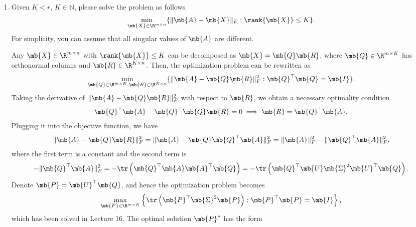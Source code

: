 \begin{exercise}
\begin{enumerate}
        \item
            Given $K<r$, $K\in \mathbb{N}$, please solve the problem as follows
            \begin{align*}
                \min_{\mb{X}\in\R^{m\times n}}\{\|\mb{A}-\mb{X}\|_F:\rank{\mb{X}}\leq K\}.
            \end{align*}
            For simplicity, you can assume that all singular values of $\mb{A}$ are different.

            \begin{solution}
                Any $\mb{X} \in \R^{m\times n}$ with $\rank{\mb{X}}\leq K$ can be decomposed as $\mb{X}=\mb{Q}\mb{R}$, where $\mb{Q}\in\R^{m\times K}$ has orthonormal columns and $\mb{R}\in\R^{K\times n}$. Then, the optimization problem can be rewritten as
                \begin{align*}
                    \min_{\mb{Q}\in\R^{m\times K},\mb{R}\in\R^{K\times n}}\{\|\mb{A}-\mb{Q}\mb{R}\|^2_F:\mb{Q}^\top\mb{Q}=\mb{I}\}.
                \end{align*}
                Taking the derivative of $\|\mb{A}-\mb{Q}\mb{R}\|^2_F$ with respect to $\mb{R}$, we obtain a necessary optimality condition
                \begin{align*}
                    \mb{Q}^\top\mb{A} - \mb{Q}^\top\mb{Q}\mb{R} = 0 \implies \mb{R} = \mb{Q}^\top\mb{A}.
                \end{align*}
                Plugging it into the objective function, we have
                \begin{align*}
                    \|\mb{A}-\mb{Q}\mb{R}\|^2_F = \|\mb{A}-\mb{Q}\mb{Q}^\top\mb{A}\|^2_F = \|\mb{A}\|^2_F - \|\mb{Q}^\top\mb{A}\|^2_F,
                \end{align*}
                where the first term is a constant and the second term is
                \begin{align*}
                    - \|\mb{Q}^\top\mb{A}\|^2_F = - \tr \left(\mb{Q}^\top\mb{A}\mb{A}^\top\mb{Q}\right) = - \tr \left(\mb{Q}^\top \mb{U} \mb{\Sigma}^2 \mb{U}^\top \mb{Q}\right).
                \end{align*}
                Denote $\mb{P} = \mb{U}^\top \mb{Q}$, and hence the optimization problem becomes
                \begin{align*}
                    \max_{\mb{P}\in\R^{m\times K}}\left\{\tr \left(\mb{P}^\top \mb{\Sigma}^2 \mb{P}\right):\mb{P}^\top\mb{P}=\mb{I}\right\},
                \end{align*}
                which has been solved in Lecture 16. The optimal solution $\mb{P}^*$ has the form

\end{solution}
\end{enumerate}
\end{exercise}
